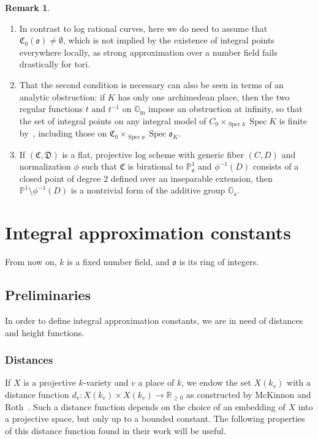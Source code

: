 \documentclass[a4paper, twoside, 11pt]{amsart}
\theoremstyle{definition}
\newtheorem{remark}[theorem]{Remark}
\newcommand{\mC}{\mathfrak{C}}
\newcommand{\mD}{\mathfrak{D}}
\newcommand{\fo}{\mathfrak{o}}
\newcommand{\GG}{\mathbb{G}}
\newcommand{\PP}{\mathbb{P}}
\newcommand{\RR}{\mathbb{R}}
\newcommand{\Gm}{\mathbb{G}_\mathrm{m}}
\DeclareMathOperator{\Spec}{Spec}
\begin{document}
\begin{remark}
	\begin{enumerate}
		\item 	In contrast to log rational curves, here we do need to assume that $\mC_0(\fo)\ne \emptyset$, which is not implied by the existence of integral points everywhere locally, as strong approximation over a number field fails drastically for tori.
		\item That the second condition is necessary can also be seen in terms of an analytic obstruction: if $K$ has only one archimedean place, then the two regular functions $t$ and $t^{-1}$ on $\Gm$ impose an obstruction at infinity, so that the set of integral points on any integral model of $C_0 \times_{\Spec k} \Spec K$ is finite by~\cite[Thm.~2.3.11]{Wilsch-toric}, including those on $\mC_0 \times_{\Spec \fo} \Spec \fo_K$. 
        \item 	If $(\mC,\mD)$ is a flat, projective log scheme with generic fiber $(C,D)$ and normalization $\phi$ such that $\mC$ is birational to $\PP^1_\fo$ and $\phi^{-1}(D)$ consists of a closed point of degree $2$ defined over an inseparable extension, then $\PP^1\setminus \phi^{-1}(D)$ is a nontrivial form of the additive group $\GG_{\mathrm{a}}$.
	\end{enumerate}
\end{remark}


\section{Integral approximation constants}\label{se:intappcst}
From now on, $k$ is a fixed number field, and $\fo$ is its ring of integers.
\subsection{Preliminaries}
In order to define integral approximation constants, we are in need of distances and height functions.

\subsubsection*{Distances}
If $X$ is a projective $k$-variety and $v$ a place of $k$, we endow the set $X(k_v)$ with a distance function $d_v\colon X(k_v)\times X(k_v)\to \RR_{\ge 0}$ as constructed by McKinnon and Roth~\cite[(2.1--2)]{McK-Roth}. Such a distance function depends on the choice of an embedding of $X$ into a projective space, but only up to a bounded constant. The following properties of this distance function found in their work will be useful.
\end{document}
